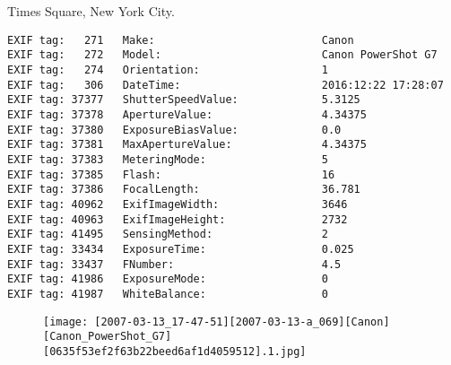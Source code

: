 \section{\protect{}}
\noindent Times Square, New York City.
\noindent
\begin{lstlisting}
EXIF tag:   271   Make:                          Canon
EXIF tag:   272   Model:                         Canon PowerShot G7
EXIF tag:   274   Orientation:                   1
EXIF tag:   306   DateTime:                      2016:12:22 17:28:07
EXIF tag: 37377   ShutterSpeedValue:             5.3125
EXIF tag: 37378   ApertureValue:                 4.34375
EXIF tag: 37380   ExposureBiasValue:             0.0
EXIF tag: 37381   MaxApertureValue:              4.34375
EXIF tag: 37383   MeteringMode:                  5
EXIF tag: 37385   Flash:                         16
EXIF tag: 37386   FocalLength:                   36.781
EXIF tag: 40962   ExifImageWidth:                3646
EXIF tag: 40963   ExifImageHeight:               2732
EXIF tag: 41495   SensingMethod:                 2
EXIF tag: 33434   ExposureTime:                  0.025
EXIF tag: 33437   FNumber:                       4.5
EXIF tag: 41986   ExposureMode:                  0
EXIF tag: 41987   WhiteBalance:                  0

\end{lstlisting}
\clearpage
\begin{figure}
\raggedleft
\texttt{[image: [2007-03-13\_17-47-51][2007-03-13-a\_069][Canon][Canon\_PowerShot\_G7][0635f53ef2f63b22beed6af1d4059512].1.jpg]}
\end{figure}


\clearpage
